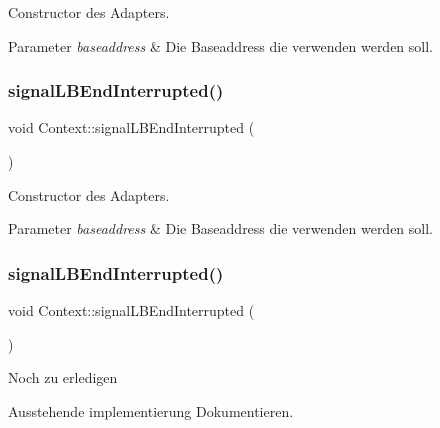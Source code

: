 Constructor des Adapters.


\begin{DoxyParams}{Parameter}
{\em baseaddress} & Die Baseaddress die verwenden werden soll. \\
\hline
\end{DoxyParams}
\hypertarget{class_context_a9e9d5d85cafe8b295193f01fd2b7a8ee}{}\label{class_context_a9e9d5d85cafe8b295193f01fd2b7a8ee} 
\subsubsection{\texorpdfstring{signal\+L\+B\+End\+Interrupted()}{signalLBEndInterrupted()}\hspace{0.1cm}{\footnotesize\ttfamily [1/2]}}
{\footnotesize\ttfamily void Context\+::signal\+L\+B\+End\+Interrupted (\begin{DoxyParamCaption}{ }\end{DoxyParamCaption})}

Constructor des Adapters.


\begin{DoxyParams}{Parameter}
{\em baseaddress} & Die Baseaddress die verwenden werden soll. \\
\hline
\end{DoxyParams}
\hypertarget{class_context_a9e9d5d85cafe8b295193f01fd2b7a8ee}{}\label{class_context_a9e9d5d85cafe8b295193f01fd2b7a8ee} 
\subsubsection{\texorpdfstring{signal\+L\+B\+End\+Interrupted()}{signalLBEndInterrupted()}\hspace{0.1cm}{\footnotesize\ttfamily [2/2]}}
{\footnotesize\ttfamily void Context\+::signal\+L\+B\+End\+Interrupted (\begin{DoxyParamCaption}{ }\end{DoxyParamCaption})}

\begin{DoxyRefDesc}{Noch zu erledigen}
\item[\hyperlink{todo__todo000002}{Noch zu erledigen}]Ausstehende implementierung Dokumentieren. \end{DoxyRefDesc}
\hypertarget{class_context_a6debf81836f13909119658b40e32fe1c}{}\label{class_context_a6debf81836f13909119658b40e32fe1c} 
